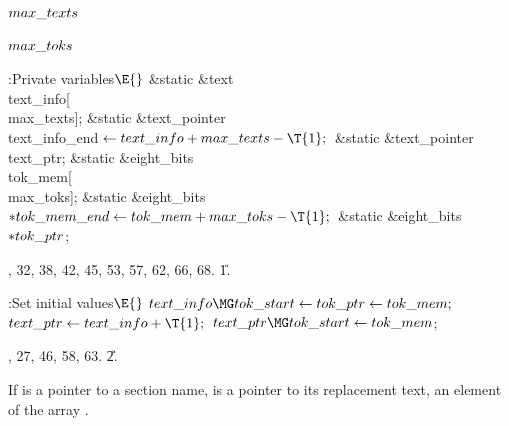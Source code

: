 \B\D$\\{max\_texts}$ \5
\par
\B\4\D$\\{max\_toks}$ \5
\par
\Y\B\4:Private variables\X${}\E{}$\6
\&{static} \&{text} \\{text\_info}[\\{max\_texts}];\6
\&{static} \&{text\_pointer} \\{text\_info\_end}${}\K\\{text\_info}+\\{max%
\_texts}-\T{1};{}$\6
\&{static} \&{text\_pointer} \\{text\_ptr};\6
\&{static} \&{eight\_bits} \\{tok\_mem}[\\{max\_toks}];\6
\&{static} \&{eight\_bits} ${}{*}\\{tok\_mem\_end}\K\\{tok\_mem}+\\{max\_toks}-%
\T{1};{}$\6
\&{static} \&{eight\_bits} ${}{*}\\{tok\_ptr}{}$;\par
{}, 32, 38, 42, 45, 53, 57, 62, 66, 68.
\U1.\fi

\B{}:Set initial values\X${}\E{}$\6
$\\{text\_info}\MG\\{tok\_start}\K\\{tok\_ptr}\K\\{tok\_mem};{}$\6
${}\\{text\_ptr}\K\\{text\_info}+\T{1};{}$\6
${}\\{text\_ptr}\MG\\{tok\_start}\K\\{tok\_mem}{}$;\par
{}, 27, 46, 58, 63.
\U2.\fi

If  is a pointer to a section name,  is a
pointer to its
replacement text, an element of the array .

